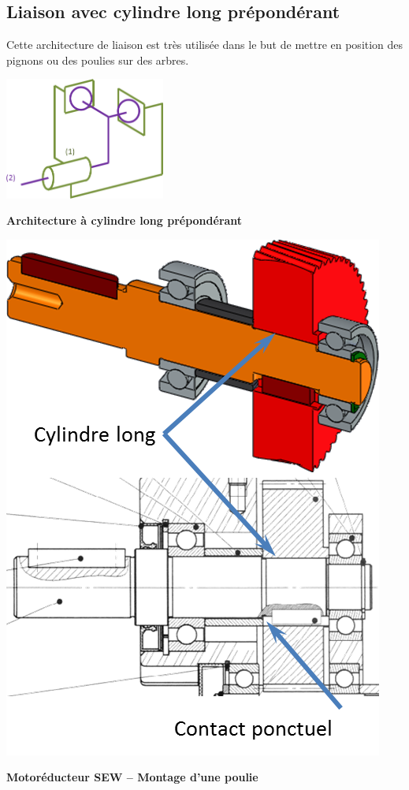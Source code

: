 \documentclass[11pt,oneside]{article}
\begin{document}
\subsection{Liaison avec cylindre long prépondérant}

Cette architecture de liaison est très utilisée dans le but de mettre en position des pignons ou des poulies sur des arbres. 


\noindent\begin{minipage}[c]{.45\linewidth}
\begin{center}
\includegraphics[height=4cm]{png/archi1}

\textbf{Architecture à cylindre long prépondérant}
\end{center}
\end{minipage}\hfill
\noindent\begin{minipage}[c]{.45\linewidth}
\begin{center}
\includegraphics[width=.8\textwidth]{png/sew_1}

\textbf{Motoréducteur SEW \cite{sew} -- Montage d'une poulie}
\end{center}
\end{minipage}
\end{document}
